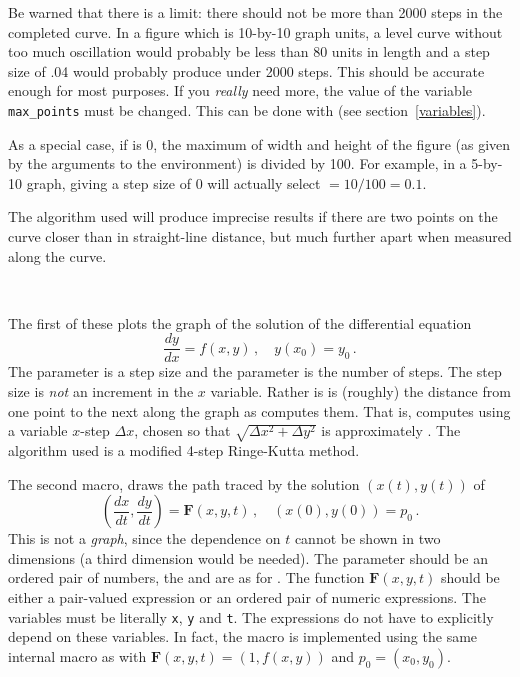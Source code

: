 \documentclass[letterpaper]{article}
\begin{document}
Be warned that there is a limit: there should not be more than 2000
steps in the completed curve. In a figure which is 10-by-10 graph units,
a level curve without too much oscillation would probably be less than
80 units in length and a step size of .04 would probably produce under
2000 steps. This should be accurate enough for most purposes. If you
\emph{really} need more, the value of the \MF{} variable
\verb$max_points$ must be changed. This can be done with
 (see section~\ref{variables}).

As a special case, if  is 0, the maximum of width and height
of the figure (as given by the arguments to the  environment)
is divided by 100. For example, in a 5-by-10 graph, giving a step size
of $0$ will actually select ${}= 10/100 = 0.1$.

The algorithm used will produce imprecise results if there are two
points on the curve closer than  in straight-line distance,
but much further apart when measured along the curve.

\begin{cd}
%
    \\
%
%
%
\end{cd}

The first of these plots the graph of the solution of the differential
equation
$$
  \frac{dy}{dx} = f(x,y)\,,\quad y(x_0) = y_0\,.
$$
The  parameter is a step size and the 
parameter is the number of steps. The step size is \emph{not} an
increment in the $x$ variable. Rather is is (roughly) the distance from
one point to the next along the graph as \MF{} computes them. That is,
\MF{} computes using a variable $x$-step $\Delta x$, chosen so that
$\sqrt{\Delta x^2 + \Delta y^2}$ is approximately . The
algorithm used is a modified 4-step Ringe-Kutta method.

The second macro,  draws the path traced by the
solution $(x(t),y(t))$ of
$$
  \left( \frac{dx}{dt},\frac{dy}{dt} \right) = \mathbf{F}(x,y,t)\,,
  \quad (x(0),y(0)) = p_0\,.
$$
This is not a \emph{graph}, since the dependence on $t$ cannot be shown
in two dimensions (a third dimension would be needed). The parameter
 should be an ordered pair of numbers, the  and
 are as for . The function $\mathbf{F}(x,y,t)$
should be either a pair-valued expression or an ordered pair of numeric
expressions. The variables must be literally \texttt{x}, \texttt{y} and
\texttt{t}. The expressions do not have to explicitly depend on these
variables. In fact, the  macro is implemented using the same
internal macro as  with $\mathbf{F}(x,y,t) = (1,
f(x,y))$ and $p_0 = (x_0,y_0)$.
\end{document}
